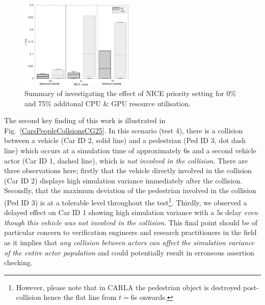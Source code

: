 \documentclass[letterpaper, 10 pt, journal, twoside]{IEEEtran}
\begin{document}
\begin{figure}[t]
    \centering
    \includegraphics[width=0.48\textwidth]{Other/Figures/NICE_analysis_summary_V4.pdf}
    \caption{Summary of investigating the effect of NICE priority setting for 0\% and 75\% additonal CPU \& GPU resource utilisation.}
    \label{NICEExperimentStressSummary}
\end{figure}


The second key finding of this work is illustrated in Fig.~\ref{CarsPeopleCollsionsCG25}. In this scenario (test 4), there is a collision between a vehicle (Car ID 2, solid line) and a pedestrian (Ped ID 3, dot dash line) which occurs at a simulation time of approximately $6$s and a second vehicle actor (Car ID 1, dashed line), which is \textit{not involved in the collision}. There are three observations here; firstly that the vehicle directly involved in the collision (Car ID 2) displays high simulation variance immediately after the collision.
Secondly, that the maximum deviation of the pedestrian involved in the collision (Ped ID 3) is at a tolerable level throughout the test\footnote{However, please note that in CARLA the pedestrian object is destroyed post-collision hence the flat line from $t=6$s onwards.}. Thirdly, we observed a delayed effect on Car ID 1 showing high simulation variance with a $5$s delay \textit{even though this vehicle was not involved in the collision}. This final point should be of particular concern to verification engineers and research practitioners in the field as it implies that \textit{any collision between actors can affect the simulation variance of the entire actor population} and could potentially result in  erroneous assertion checking.



\end{document}
